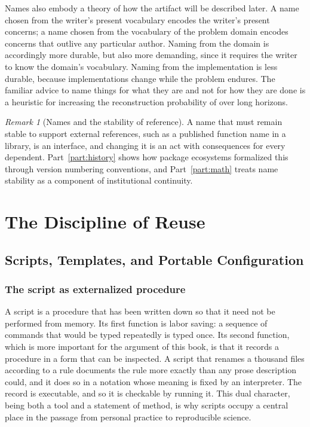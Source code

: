 \documentclass[11pt,twoside,openright]{book}
\theoremstyle{plain}
\theoremstyle{definition}
\theoremstyle{remark}
\newtheorem{remark}[theorem]{Remark}
\begin{document}
Names also embody a theory of how the artifact will be described later. A name chosen from the writer's present vocabulary encodes the writer's present concerns; a name chosen from the vocabulary of the problem domain encodes concerns that outlive any particular author. Naming from the domain is accordingly more durable, but also more demanding, since it requires the writer to know the domain's vocabulary. Naming from the implementation is less durable, because implementations change while the problem endures. The familiar advice to name things for what they are and not for how they are done is a heuristic for increasing the reconstruction probability of  over long horizons.

\begin{remark}[Names and the stability of reference]
A name that must remain stable to support external references, such as a published function name in a library, is an interface, and changing it is an act with consequences for every dependent. Part~\ref{part:history} shows how package ecosystems formalized this through version numbering conventions, and Part~\ref{part:math} treats name stability as a component of institutional continuity.
\end{remark}

\part{The Discipline of Reuse}\label{part:reuse}

\chapter{Scripts, Templates, and Portable Configuration}\label{ch:scripts}

\section{The script as externalized procedure}

A script is a procedure that has been written down so that it need not be performed from memory. Its first function is labor saving: a sequence of commands that would be typed repeatedly is typed once. Its second function, which is more important for the argument of this book, is that it records a procedure in a form that can be inspected. A script that renames a thousand files according to a rule documents the rule more exactly than any prose description could, and it does so in a notation whose meaning is fixed by an interpreter. The record is executable, and so it is checkable by running it. This dual character, being both a tool and a statement of method, is why scripts occupy a central place in the passage from personal practice to reproducible science.
\end{document}
